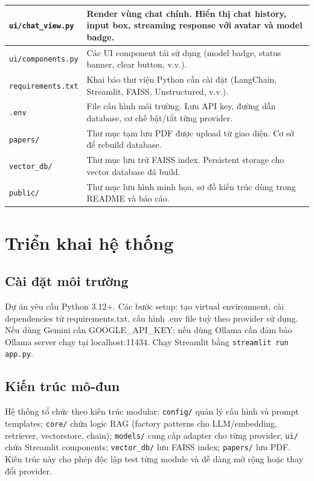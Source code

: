 \documentclass[10pt, conference, a4paper, compsocconf]{IEEEtran}
\begin{document}
\begin{table}[ht]
{\begin{tabular}{|l|p{6.5cm}|}
\texttt{ui/chat\_view.py} & Render vùng chat chính. Hiển thị chat history, input box, streaming response với avatar và model badge. \\ \hline
\texttt{ui/components.py} & Các UI component tái sử dụng (model badge, status banner, clear button, v.v.). \\ \hline
\texttt{requirements.txt} & Khai báo thư viện Python cần cài đặt (LangChain, Streamlit, FAISS, Unstructured, v.v.). \\ \hline
\texttt{.env} & File cấu hình môi trường. Lưu API key, đường dẫn database, cơ chế bật/tắt từng provider. \\ \hline
\texttt{papers/} & Thư mục tạm lưu PDF được upload từ giao diện. Cơ sở để rebuild database. \\ \hline
\texttt{vector\_db/} & Thư mục lưu trữ FAISS index. Persistent storage cho vector database đã build. \\ \hline
\texttt{public/} & Thư mục lưu hình minh họa, sơ đồ kiến trúc dùng trong README và báo cáo. \\ \hline
\end{tabular}%
}
\end{table}


    

\section{Triển khai hệ thống}
\subsection{Cài đặt môi trường}
Dự án yêu cầu Python 3.12+. Các bước setup: tạo virtual environment, cài dependencies từ requirements.txt, cấu hình .env file tuỳ theo provider sử dụng. Nếu dùng Gemini cần GOOGLE\_API\_KEY; nếu dùng Ollama cần đảm bảo Ollama server chạy tại localhost:11434. Chạy Streamlit bằng \verb|streamlit run app.py|.

\subsection{Kiến trúc mô-đun}
Hệ thống tổ chức theo kiến trúc modular: \texttt{config/} quản lý cấu hình và prompt templates; \texttt{core/} chứa logic RAG (factory patterns cho LLM/embedding, retriever, vectorstore, chain); \texttt{models/} cung cấp adapter cho từng provider; \texttt{ui/} chứa Streamlit components; \texttt{vector\_db/} lưu FAISS index; \texttt{papers/} lưu PDF. Kiến trúc này cho phép độc lập test từng module và dễ dàng mở rộng hoặc thay đổi provider.
\end{document}
